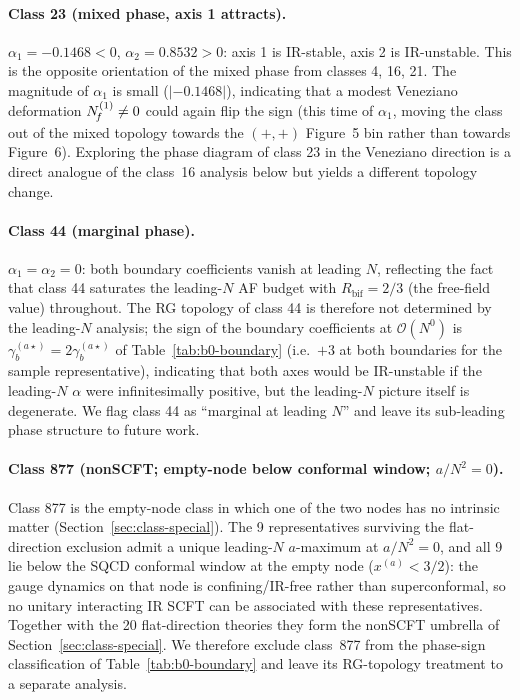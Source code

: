 \paragraph{Class 23 (mixed phase, axis 1 attracts).}
$\alpha_{1}=-0.1468<0$, $\alpha_{2}=0.8532>0$: axis 1 is IR-stable,
axis 2 is IR-unstable.  This is the opposite orientation of the mixed
phase from classes 4, 16, 21.  The magnitude of
$\alpha_{1}$ is small ($|{-}0.1468|$), indicating that a modest
Veneziano deformation $N_{\!f}^{(1)}\ne 0$ could again flip the sign
(this time of $\alpha_{1}$, moving the class out of the mixed
topology towards the $(+,+)$ Figure~5 bin rather than towards
Figure~6).  Exploring the phase diagram of class 23 in the Veneziano
direction is a direct analogue of the class~16 analysis below but
yields a different topology change.

\paragraph{Class 44 (marginal phase).}
$\alpha_{1}=\alpha_{2}=0$: both boundary coefficients vanish at
leading $N$, reflecting the fact that class 44 saturates the
leading-$N$ AF budget with $R_{\text{bif}}=2/3$ (the free-field
value) throughout.  The RG topology of class 44 is therefore not
determined by the leading-$N$ analysis; the sign of the boundary
coefficients at $\mathcal O(N^{0})$ is
$\gamma_{b}^{(a\star)}=2\gamma_{b}^{(a\star)}$ of
Table~\ref{tab:b0-boundary} (i.e.\ $+3$ at both boundaries for the
sample representative), indicating that both axes would be
IR-unstable if the leading-$N$ $\alpha$ were infinitesimally
positive, but the leading-$N$ picture itself is degenerate.  We flag
class 44 as ``marginal at leading $N$'' and leave its sub-leading
phase structure to future work.

\paragraph{Class 877 (nonSCFT; empty-node below conformal window; $a/N^{2}=0$).}
Class 877 is the empty-node class in which one of the two nodes has
no intrinsic matter (Section~\ref{sec:class-special}).  The 9
representatives surviving the flat-direction exclusion admit a unique
leading-$N$ $a$-maximum at $a/N^{2}=0$, and all 9 lie below the SQCD
conformal window at the empty node ($x^{(a)}<3/2$): the gauge
dynamics on that node is confining/IR-free rather than superconformal,
so no unitary interacting IR SCFT can be associated with these
representatives.  Together with the 20 flat-direction theories they
form the nonSCFT umbrella of Section~\ref{sec:class-special}.  We
therefore exclude class~877 from the phase-sign classification of
Table~\ref{tab:b0-boundary} and leave its RG-topology treatment to a
separate analysis.

